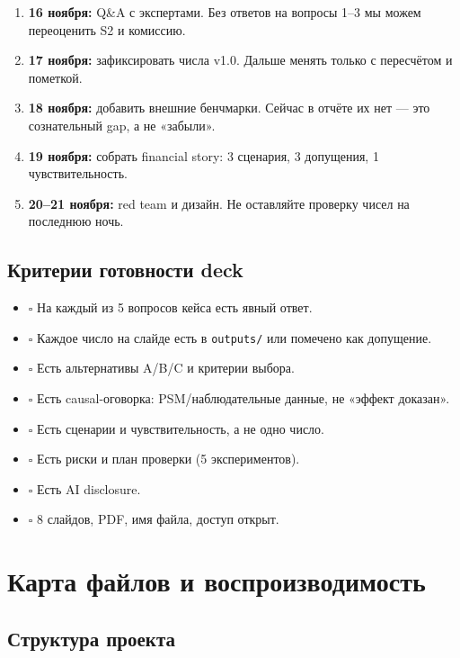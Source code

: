 \documentclass[10pt,a4paper]{article}
\begin{document}
\begin{enumerate}[leftmargin=1.35em,itemsep=2pt,topsep=3pt,parsep=0pt]
\item \textbf{16 ноября:} Q\&A с экспертами. Без ответов на вопросы 1–3 мы можем переоценить S2 и комиссию.
\item \textbf{17 ноября:} зафиксировать числа v1.0. Дальше менять только с пересчётом и пометкой.
\item \textbf{18 ноября:} добавить внешние бенчмарки. Сейчас в отчёте их нет — это сознательный gap, а не «забыли».
\item \textbf{19 ноября:} собрать financial story: 3 сценария, 3 допущения, 1 чувствительность.
\item \textbf{20–21 ноября:} red team и дизайн. Не оставляйте проверку чисел на последнюю ночь.
\end{enumerate}

\subsection{Критерии готовности deck}

\begin{itemize}[leftmargin=1.35em,itemsep=2pt,topsep=3pt,parsep=0pt]
\item $\square$ На каждый из 5 вопросов кейса есть явный ответ.
\item $\square$ Каждое число на слайде есть в \texttt{outputs/} или помечено как допущение.
\item $\square$ Есть альтернативы A/B/C и критерии выбора.
\item $\square$ Есть causal-оговорка: PSM/наблюдательные данные, не «эффект доказан».
\item $\square$ Есть сценарии и чувствительность, а не одно число.
\item $\square$ Есть риски и план проверки (5 экспериментов).
\item $\square$ Есть AI disclosure.
\item $\square$ 8 слайдов, PDF, имя файла, доступ открыт.
\end{itemize}

\clearpage

\section{Карта файлов и воспроизводимость}

\subsection{Структура проекта}
\end{document}
